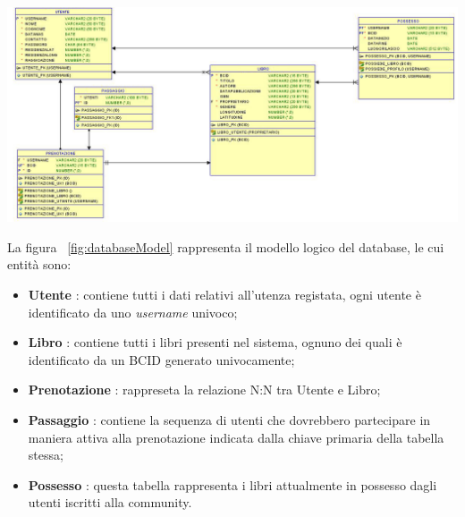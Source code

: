 \begin{center}
\begin{sideways}%
	\begin{minipage}{1.4\textwidth}
		\includegraphics[width=\linewidth,keepaspectratio]{Immagini/db_schema.jpg}
		\vspace{0.2cm}
		\label{fig:databaseModel}
	\end{minipage}
\end{sideways}
\end{center}
\newpage
La figura ~\ref{fig:databaseModel} rappresenta il modello logico del database, le cui entità sono:
\begin{itemize}
	\item \textbf{Utente} : contiene tutti i dati relativi all'utenza registata, ogni utente è identificato da uno \textit{username} univoco;
	\item \textbf{Libro} : contiene tutti i libri presenti nel sistema, ognuno dei quali è identificato da un BCID generato univocamente;
	\item \textbf{Prenotazione} : rappreseta la relazione N:N tra Utente e Libro;
	\item \textbf{Passaggio} : contiene la sequenza di utenti che dovrebbero partecipare in maniera attiva alla prenotazione indicata dalla chiave primaria della tabella stessa;
	\item \textbf{Possesso} : questa tabella rappresenta i libri attualmente in possesso dagli utenti iscritti alla community.
\end{itemize}